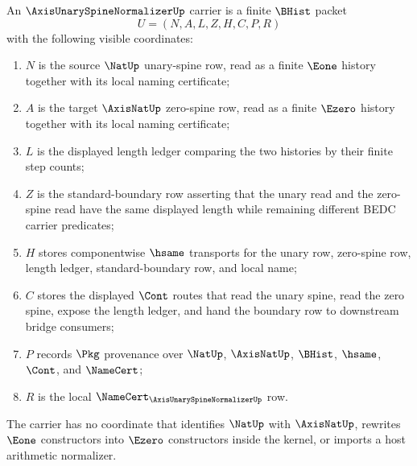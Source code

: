 \begin{definition}
\label{def:axis-unary-spine-normalizer-carrier}
An $\AxisUnarySpineNormalizerUp$ carrier is a finite $\BHist$ packet
$$
U=(N,A,L,Z,H,C,P,R)
$$
with the following visible coordinates:
\begin{enumerate}
\item $N$ is the source $\NatUp$ unary-spine row, read as a finite $\Eone$ history together with its local naming certificate;
\item $A$ is the target $\AxisNatUp$ zero-spine row, read as a finite $\Ezero$ history together with its local naming certificate;
\item $L$ is the displayed length ledger comparing the two histories by their finite step counts;
\item $Z$ is the standard-boundary row asserting that the unary read and the zero-spine read have the same displayed length while remaining different BEDC carrier predicates;
\item $H$ stores componentwise $\hsame$ transports for the unary row, zero-spine row, length ledger, standard-boundary row, and local name;
\item $C$ stores the displayed $\Cont$ routes that read the unary spine, read the zero spine, expose the length ledger, and hand the boundary row to downstream bridge consumers;
\item $P$ records $\Pkg$ provenance over $\NatUp$, $\AxisNatUp$, $\BHist$, $\hsame$, $\Cont$, and $\NameCert$;
\item $R$ is the local $\NameCert_{\AxisUnarySpineNormalizerUp}$ row.
\end{enumerate}
The carrier has no coordinate that identifies $\NatUp$ with $\AxisNatUp$, rewrites $\Eone$ constructors into $\Ezero$ constructors inside the kernel, or imports a host arithmetic normalizer.
\end{definition}

